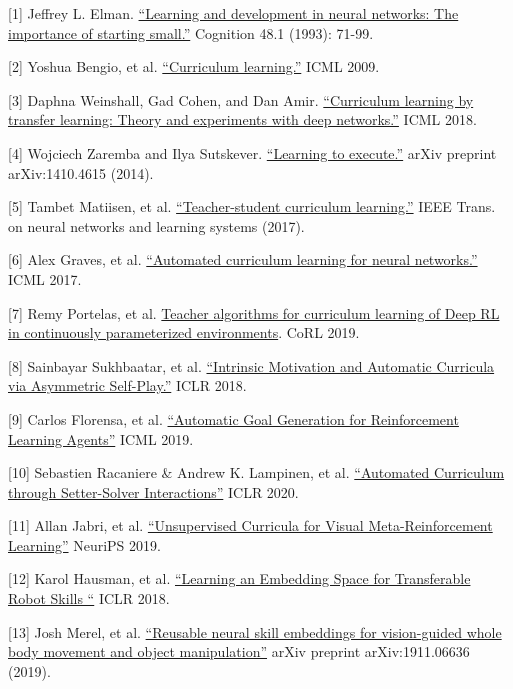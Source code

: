 {[}1{]} Jeffrey L. Elman. \href{http://citeseerx.ist.psu.edu/viewdoc/download?doi=10.1.1.128.4487&rep=rep1&type=pdf}{``Learning and development in neural networks: The importance of starting small.''} Cognition 48.1 (1993): 71-99.

{[}2{]} Yoshua Bengio, et al. \href{https://www.researchgate.net/profile/Y_Bengio/publication/221344862_Curriculum_learning/links/546cd2570cf2193b94c577ac/Curriculum-learning.pdf}{``Curriculum learning.''} ICML 2009.

{[}3{]} Daphna Weinshall, Gad Cohen, and Dan Amir. \href{https://arxiv.org/abs/1802.03796}{``Curriculum learning by transfer learning: Theory and experiments with deep networks.''} ICML 2018.

{[}4{]} Wojciech Zaremba and Ilya Sutskever. \href{https://arxiv.org/abs/1410.4615}{``Learning to execute.''} arXiv preprint arXiv:1410.4615 (2014).

{[}5{]} Tambet Matiisen, et al. \href{https://arxiv.org/abs/1707.00183}{``Teacher-student curriculum learning.''} IEEE Trans. on neural networks and learning systems (2017).

{[}6{]} Alex Graves, et al. \href{https://arxiv.org/abs/1704.03003}{``Automated curriculum learning for neural networks.''} ICML 2017.

{[}7{]} Remy Portelas, et al. \href{https://arxiv.org/abs/1910.07224}{Teacher algorithms for curriculum learning of Deep RL in continuously parameterized environments}. CoRL 2019.

{[}8{]} Sainbayar Sukhbaatar, et al. \href{https://arxiv.org/abs/1703.05407}{``Intrinsic Motivation and Automatic Curricula via Asymmetric Self-Play.''} ICLR 2018.

{[}9{]} Carlos Florensa, et al. \href{https://arxiv.org/abs/1705.06366}{``Automatic Goal Generation for Reinforcement Learning Agents''} ICML 2019.

{[}10{]} Sebastien Racaniere \& Andrew K. Lampinen, et al. \href{https://arxiv.org/abs/1909.12892}{``Automated Curriculum through Setter-Solver Interactions''} ICLR 2020.

{[}11{]} Allan Jabri, et al. \href{https://arxiv.org/abs/1912.04226}{``Unsupervised Curricula for Visual Meta-Reinforcement Learning''} NeuriPS 2019.

{[}12{]} Karol Hausman, et al. \href{https://openreview.net/forum?id=rk07ZXZRb}{``Learning an Embedding Space for Transferable Robot Skills ``} ICLR 2018.

{[}13{]} Josh Merel, et al. \href{https://arxiv.org/abs/1911.06636}{``Reusable neural skill embeddings for vision-guided whole body movement and object manipulation''} arXiv preprint arXiv:1911.06636 (2019).

